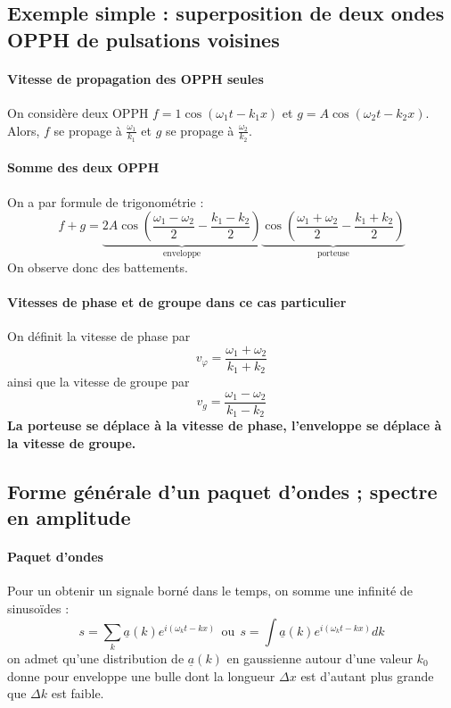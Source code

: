 \documentclass[french]{book}
\theoremstyle{plain}
\theoremstyle{definition}
\theoremstyle{remark}
\begin{document}
\subsection{Exemple simple : superposition de deux ondes OPPH de pulsations voisines}
\paragraph{Vitesse de propagation des OPPH seules} On considère deux OPPH $f=1\cos(\omega_1t-k_1x)$ et $g=A\cos(\omega_2t-k_2x)$. Alors, $f$ se propage à $\displaystyle\frac{\omega_1}{k_1}$ et $g$ se propage à $\displaystyle\frac{\omega_2}{k_2}$. 
\paragraph{Somme des deux OPPH} On a par formule de trigonométrie : $$f+g=\underbrace{2A\cos\left(\frac{\omega_1-\omega_2}{2}-\frac{k_1-k_2}{2}\right)}_\text{enveloppe}\underbrace{\cos\left(\frac{\omega_1+\omega_2}{2}-\frac{k_1+k_2}{2}\right)}_\text{porteuse}$$ On observe donc des battements.
\paragraph{Vitesses de phase et de groupe dans ce cas particulier} On définit la vitesse de phase par $$v_\varphi=\frac{\omega_1+\omega_2}{k_1+k_2}$$ ainsi que la vitesse de groupe par $$v_g=\frac{\omega_1-\omega_2}{k_1-k_2}$$ \textbf{La porteuse se déplace à la vitesse de phase, l'enveloppe se déplace à la vitesse de groupe.}
\subsection{Forme générale d'un paquet d'ondes ; spectre en amplitude}
\paragraph{Paquet d'ondes} Pour un obtenir un signale borné dans le temps, on somme une infinité de sinusoïdes : $$s=\sum_{k}\underline{a}(k)e^{i(\omega_k t-kx)} \ \ \text{ou}\ \ s=\int \underline{a}(k)e^{i(\omega_k t-kx)} dk$$ on admet qu'une distribution de $\underline{a}(k)$ en gaussienne autour d'une valeur $k_0$ donne pour enveloppe une bulle dont la longueur $\Delta x$ est d'autant plus grande que $\Delta k$ est faible.
\end{document}
